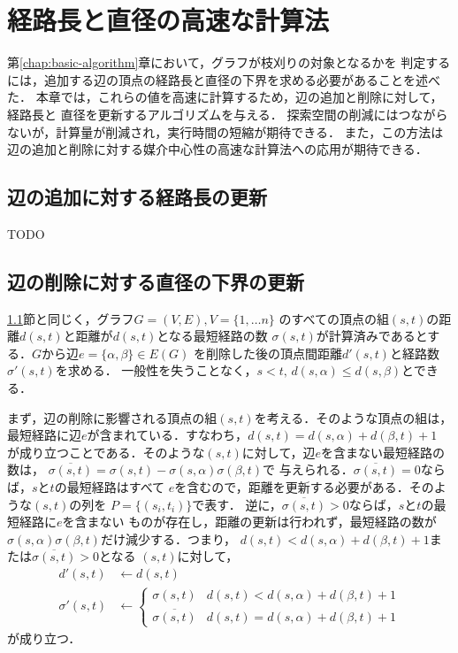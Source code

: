
\chapter{経路長と直径の高速な計算法}
\label{chap:faster-min-max}
第\ref{chap:basic-algorithm}章において，グラフが枝刈りの対象となるかを
判定するには，追加する辺の頂点の経路長と直径の下界を求める必要があることを述べた．
本章では，これらの値を高速に計算するため，辺の追加と削除に対して，経路長と
直径を更新するアルゴリズムを与える．
探索空間の削減にはつながらないが，計算量が削減され，実行時間の短縮が期待できる．
また，この方法は辺の追加と削除に対する媒介中心性の高速な計算法への応用が期待できる．

\section{辺の追加に対する経路長の更新}
\label{sect:update-path-length}
TODO

\section{辺の削除に対する直径の下界の更新}
\label{sect:update-lower-bound-of-diameter}
\ref{sect:update-path-length}節と同じく，グラフ$G=(V,E),V=\{1,\ldots n\}$
のすべての頂点の組$(s,t)$の距離$d(s,t)$と距離が$d(s,t)$となる最短経路の数
$\sigma(s,t)$が計算済みであるとする．$G$から辺$e=\{\alpha,\beta\}\in E(G)$
を削除した後の頂点間距離$d'(s,t)$と経路数$\sigma'(s,t)$を求める．
一般性を失うことなく，$s<t,\,d(s,\alpha)\leq d(s,\beta)$とできる．

まず，辺の削除に影響される頂点の組$(s,t)$を考える．そのような頂点の組は，
最短経路に辺$e$が含まれている．すなわち，$d(s,t) = d(s,\alpha)+d(\beta,t)+1$
が成り立つことである．そのような$(s,t)$に対して，辺$e$を含まない最短経路の数は，
$\overline{\sigma(s,t)}=\sigma(s,t)-\sigma(s,\alpha)\sigma(\beta,t)$で
与えられる．$\overline{\sigma(s,t)}=0$ならば，$s$と$t$の最短経路はすべて
$e$を含むので，距離を更新する必要がある．そのような$(s,t)$の列を
$P=\{(s_i,t_i)\}$で表す．
逆に，$\overline{\sigma(s,t)}>0$ならば，$s$と$t$の最短経路に$e$を含まない
ものが存在し，距離の更新は行われず，最短経路の数が
$\sigma(s,\alpha)\sigma(\beta,t)$だけ減少する．つまり，
$d(s,t)<d(s,\alpha)+d(\beta,t)+1$または$\overline{\sigma(s,t)}>0$となる
$(s,t)$に対して，
\begin{align*}
  d'(s,t) &\gets d(s,t) \\
  \sigma'(s,t) &\gets
  \begin{cases}
    \sigma(s,t) & d(s,t) < d(s,\alpha) + d(\beta,t) + 1 \\
    \overline{\sigma(s,t)} & d(s,t) = d(s,\alpha) + d(\beta,t) + 1
  \end{cases}
\end{align*}
が成り立つ．

